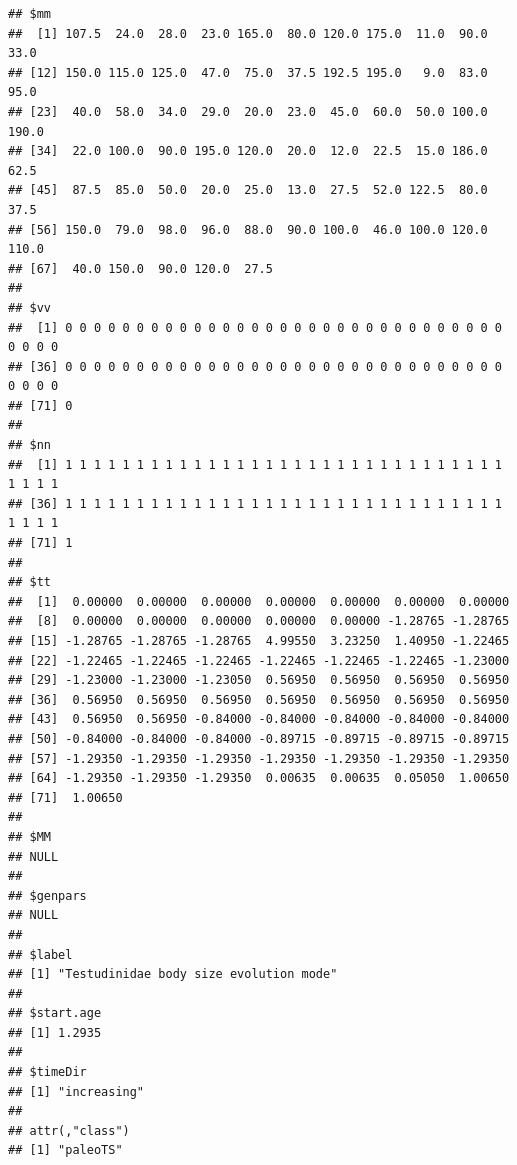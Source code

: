 \documentclass[]{article}
\newenvironment{Shaded}{\begin{snugshade}}{\end{snugshade}}
\newcommand{\KeywordTok}[1]{\textcolor[rgb]{0.13,0.29,0.53}{\textbf{{#1}}}}
\newcommand{\DataTypeTok}[1]{\textcolor[rgb]{0.13,0.29,0.53}{{#1}}}
\newcommand{\DecValTok}[1]{\textcolor[rgb]{0.00,0.00,0.81}{{#1}}}
\newcommand{\StringTok}[1]{\textcolor[rgb]{0.31,0.60,0.02}{{#1}}}
\newcommand{\OtherTok}[1]{\textcolor[rgb]{0.56,0.35,0.01}{{#1}}}
\newcommand{\NormalTok}[1]{{#1}}
\begin{document}
\begin{Shaded}
\end{Shaded}

\begin{verbatim}
## $mm
##  [1] 107.5  24.0  28.0  23.0 165.0  80.0 120.0 175.0  11.0  90.0  33.0
## [12] 150.0 115.0 125.0  47.0  75.0  37.5 192.5 195.0   9.0  83.0  95.0
## [23]  40.0  58.0  34.0  29.0  20.0  23.0  45.0  60.0  50.0 100.0 190.0
## [34]  22.0 100.0  90.0 195.0 120.0  20.0  12.0  22.5  15.0 186.0  62.5
## [45]  87.5  85.0  50.0  20.0  25.0  13.0  27.5  52.0 122.5  80.0  37.5
## [56] 150.0  79.0  98.0  96.0  88.0  90.0 100.0  46.0 100.0 120.0 110.0
## [67]  40.0 150.0  90.0 120.0  27.5
## 
## $vv
##  [1] 0 0 0 0 0 0 0 0 0 0 0 0 0 0 0 0 0 0 0 0 0 0 0 0 0 0 0 0 0 0 0 0 0 0 0
## [36] 0 0 0 0 0 0 0 0 0 0 0 0 0 0 0 0 0 0 0 0 0 0 0 0 0 0 0 0 0 0 0 0 0 0 0
## [71] 0
## 
## $nn
##  [1] 1 1 1 1 1 1 1 1 1 1 1 1 1 1 1 1 1 1 1 1 1 1 1 1 1 1 1 1 1 1 1 1 1 1 1
## [36] 1 1 1 1 1 1 1 1 1 1 1 1 1 1 1 1 1 1 1 1 1 1 1 1 1 1 1 1 1 1 1 1 1 1 1
## [71] 1
## 
## $tt
##  [1]  0.00000  0.00000  0.00000  0.00000  0.00000  0.00000  0.00000
##  [8]  0.00000  0.00000  0.00000  0.00000  0.00000 -1.28765 -1.28765
## [15] -1.28765 -1.28765 -1.28765  4.99550  3.23250  1.40950 -1.22465
## [22] -1.22465 -1.22465 -1.22465 -1.22465 -1.22465 -1.22465 -1.23000
## [29] -1.23000 -1.23000 -1.23050  0.56950  0.56950  0.56950  0.56950
## [36]  0.56950  0.56950  0.56950  0.56950  0.56950  0.56950  0.56950
## [43]  0.56950  0.56950 -0.84000 -0.84000 -0.84000 -0.84000 -0.84000
## [50] -0.84000 -0.84000 -0.84000 -0.89715 -0.89715 -0.89715 -0.89715
## [57] -1.29350 -1.29350 -1.29350 -1.29350 -1.29350 -1.29350 -1.29350
## [64] -1.29350 -1.29350 -1.29350  0.00635  0.00635  0.05050  1.00650
## [71]  1.00650
## 
## $MM
## NULL
## 
## $genpars
## NULL
## 
## $label
## [1] "Testudinidae body size evolution mode"
## 
## $start.age
## [1] 1.2935
## 
## $timeDir
## [1] "increasing"
## 
## attr(,"class")
## [1] "paleoTS"
\end{verbatim}
\end{document}

